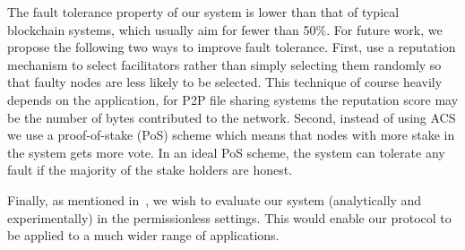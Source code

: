 The fault tolerance property of our system is lower than that of typical blockchain systems,
which usually aim for fewer than 50\%.
For future work, we propose the following two ways to improve fault tolerance.
First, use a reputation mechanism to select facilitators rather than simply selecting them randomly so that faulty nodes are less likely to be selected.
This technique of course heavily depends on the application,
for P2P file sharing systems the reputation score may be the number of bytes contributed to the network.
Second, instead of using ACS we use a proof-of-stake (PoS) scheme which means that nodes with more stake in the system gets more vote.
In an ideal PoS scheme, the system can tolerate any fault if the majority of the stake holders are honest.

Finally, as mentioned in~, we wish to evaluate our system (analytically and experimentally) in the permissionless settings.
This would enable our protocol to be applied to a much wider range of applications.

